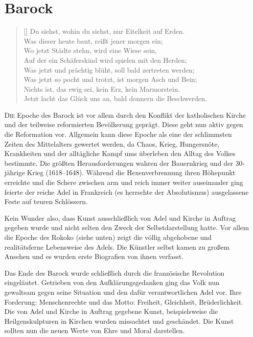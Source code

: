 \section{Barock}
\settowidth{\versewidth}{Du siehst, wohin du siehst, nur Eitelkeit auf Erden.}
\begin{verse}[\versewidth]
	Du siehst, wohin du siehst, nur Eitelkeit auf Erden. \\
	Was dieser heute baut, reißt jener morgen ein; \\
	Wo jetzt Städte stehn, wird eine Wiese sein, \\
	Auf der ein Schäferskind wird spielen mit den Herden; \\
	Was jetzt und prächtig blüht, soll bald zertreten werden; \\
	Was jetzt so pocht und trotzt, ist morgen Asch und Bein; \\
	Nichts ist, das ewig sei, kein Erz, kein Marmorstein. \\
	Jetzt lacht das Glück uns an, bald donnern die Beschwerden. \\
\end{verse}

\bigskip

\lettrine{D}{ie} Epoche des Barock ist vor allem durch den Konflikt der katholischen Kirche und der teilweise
reformierten Bevölkerung geprägt. Diese geht nun aktiv gegen die Reformation vor. Allgemein
kann diese Epoche als eine der schlimmsten Zeiten des Mittelalters gewertet werden, da Chaos,
Krieg, Hungersnöte, Krankheiten und der alltägliche Kampf ums überleben den Alltag des Volkes
bestimmte. Die größten Herausforderungen wahren der Bauernkrieg und der 30-jährige Krieg
(1618--1648). Während die Hexenverbrennung ihren Höhepunkt erreichte und die Schere zwischen
arm und reich immer weiter auseinander ging feierte der reiche Adel in Frankreich (es herrschte der
Absolutismus) ausgelassene Feste auf teuren Schlössern.

Kein Wunder also, dass Kunst ausschließlich von Adel und Kirche in Auftrag gegeben wurde und
nicht selten den Zweck der Selbstdarstellung hatte. Vor allem die Epoche des Rokoko (siehe unten)
zeigt die völlig abgehobene und realitätsferne Lebensweise des Adels. Die Künstler selbst kamen zu
großem Ansehen und es wurden erste Biografien von ihnen verfasst.

Das Ende des Barock wurde schließlich durch die französische Revolution eingeläutet. Getrieben
von den Aufklärungsgedanken ging das Volk nun gewaltsam gegen seine Situation und den dafür
verantwortlichen Adel vor. Ihre Forderung: Menschenrechte und das Motto: Freiheit, Gleichheit,
Brüderlichkeit. Die von Adel und Kirche in Auftrag gegebene Kunst, beispielsweise die Heilgenskulpturen in Kirchen wurden
missachtet und geschändet. Die Kunst sollten nun die neuen Werte
von Ehre und Moral darstellen.

